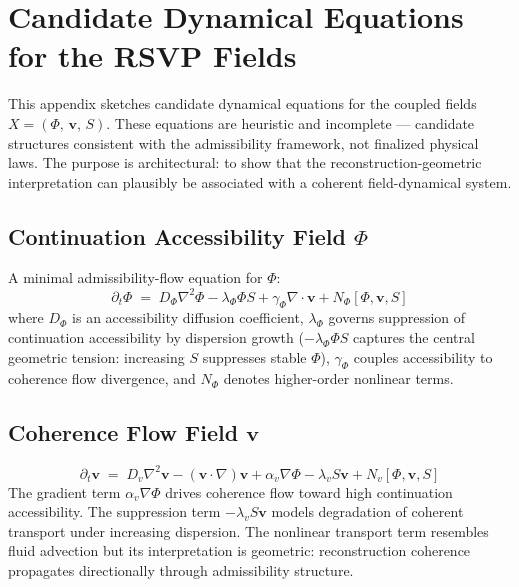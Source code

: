 \documentclass[11pt, a4paper]{article}
\theoremstyle{plain}
\theoremstyle{definition}
\theoremstyle{remark}
\newcommand{\Xfield}{X = (\Phi,\,\mathbf{v},\,S)}
\begin{document}
\section{Candidate Dynamical Equations for the RSVP Fields}
\label{app:dynamics}

This appendix sketches candidate dynamical equations for the coupled fields
$\Xfield$. These equations are heuristic and incomplete --- candidate structures
consistent with the admissibility framework, not finalized physical laws. The purpose
is architectural: to show that the reconstruction-geometric interpretation can
plausibly be associated with a coherent field-dynamical system.

\subsection{Continuation Accessibility Field $\Phi$}

A minimal admissibility-flow equation for $\Phi$:
\begin{equation}
  \label{eq:Phi}
  \partial_t\Phi \;=\; D_\Phi\nabla^2\Phi - \lambda_\Phi \Phi S
    + \gamma_\Phi \nabla\cdot\mathbf{v} + N_\Phi[\Phi,\mathbf{v},S]
\end{equation}
where $D_\Phi$ is an accessibility diffusion coefficient, $\lambda_\Phi$ governs
suppression of continuation accessibility by dispersion growth ($-\lambda_\Phi \Phi
S$ captures the central geometric tension: increasing $S$ suppresses stable $\Phi$),
$\gamma_\Phi$ couples accessibility to coherence flow divergence, and $N_\Phi$
denotes higher-order nonlinear terms.

\subsection{Coherence Flow Field $\mathbf{v}$}

\begin{equation}
  \label{eq:v}
  \partial_t\mathbf{v} \;=\; D_v\nabla^2\mathbf{v} - (\mathbf{v}\cdot\nabla)\mathbf{v}
    + \alpha_v\nabla\Phi - \lambda_v S\mathbf{v} + N_v[\Phi,\mathbf{v},S]
\end{equation}
The gradient term $\alpha_v\nabla\Phi$ drives coherence flow toward high continuation
accessibility. The suppression term $-\lambda_v S\mathbf{v}$ models degradation of
coherent transport under increasing dispersion. The nonlinear transport term resembles
fluid advection but its interpretation is geometric: reconstruction coherence
propagates directionally through admissibility structure.
\end{document}
